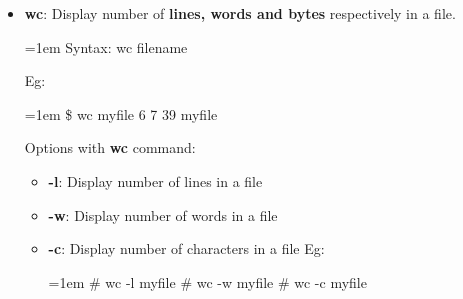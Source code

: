 \begin{flushleft}
\begin{itemize}
		\bigskip
		\bigskip
		\item \textbf{wc}: Display number of \textbf{lines, words and bytes} respectively in a file.
		\bigskip
		\begin{tcolorbox}[breakable,notitle,boxrule=-0pt,colback=pink,colframe=pink]
			\color{black}
			\font=1em
			Syntax: wc filename
			\font=4pt
		\end{tcolorbox}
		Eg:
		\bigskip
		\begin{tcolorbox}[breakable,notitle,boxrule=-0pt,colback=black,colframe=black]
			\color{green}
			\font=1em
			\$ wc myfile
			\newline
			\color{white}
			6 7 39 myfile
			\font=4pt
		\end{tcolorbox}	

		Options with \textbf{wc} command:
		\begin{itemize}
			\item \textbf{-l}: Display number of lines in a file
			\item \textbf{-w}: Display number of words in a file
			\item \textbf{-c}: Display number of characters in a file
			\newline
			Eg:
			\begin{tcolorbox}[breakable,notitle,boxrule=-0pt,colback=black,colframe=black]
				\color{green}
				\font=1em
				\# wc -l myfile
				\newline
				\# wc -w myfile
				\newline
				\# wc -c myfile
				\font=4pt
			\end{tcolorbox}	
		\end{itemize}


\end{itemize}
\end{flushleft}
